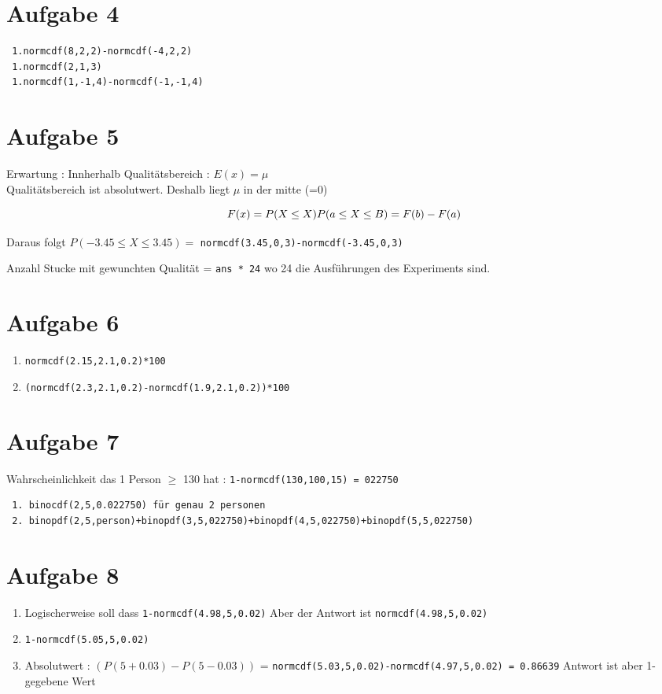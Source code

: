 \documentclass[a4paper,10pt]{scrbook}
\begin{document}
\section*{Aufgabe 4}
\begin{verbatim}
 1.normcdf(8,2,2)-normcdf(-4,2,2)
 1.normcdf(2,1,3)
 1.normcdf(1,-1,4)-normcdf(-1,-1,4)
\end{verbatim}

   
\section*{Aufgabe 5}
Erwartung : Innherhalb Qualitätsbereich : 
$E(x) = \mu$ \\
Qualitätsbereich ist absolutwert. Deshalb liegt $\mu$ in der mitte (=0) \\
\begin{framed}
 \begin{equation}
  F(x) = P(X \leq X) \\
  P(a \leq X \leq B) = F(b) - F(a)
 \end{equation}
 
\end{framed}

Daraus folgt $P(-3.45 \leq X \leq 3.45) = $ \texttt{normcdf(3.45,0,3)-normcdf(-3.45,0,3)}

Anzahl Stucke mit gewunchten Qualität = \texttt{ans * 24} wo 24 die Ausführungen des Experiments sind.

\section*{Aufgabe 6}
\begin{enumerate}
 \item \texttt{normcdf(2.15,2.1,0.2)*100}
 \item \texttt{(normcdf(2.3,2.1,0.2)-normcdf(1.9,2.1,0.2))*100}
\end{enumerate}
\section*{Aufgabe 7}

Wahrscheinlichkeit das 1 Person $\ge$ 130 hat :
\texttt{1-normcdf(130,100,15) = 022750 }
\begin{verbatim}
 1. binocdf(2,5,0.022750) für genau 2 personen
 2. binopdf(2,5,person)+binopdf(3,5,022750)+binopdf(4,5,022750)+binopdf(5,5,022750)
\end{verbatim}
\section*{Aufgabe 8}
\begin{enumerate}
\item Logischerweise soll dass \texttt{1-normcdf(4.98,5,0.02)}
Aber der Antwort ist \texttt{normcdf(4.98,5,0.02)}
\item \texttt{1-normcdf(5.05,5,0.02)}
\item Absolutwert : $(P(5+0.03)-P(5-0.03))$ = \texttt{normcdf(5.03,5,0.02)-normcdf(4.97,5,0.02) = 0.86639} Antwort ist 
aber 1- gegebene Wert
\end{enumerate}
\end{document}
